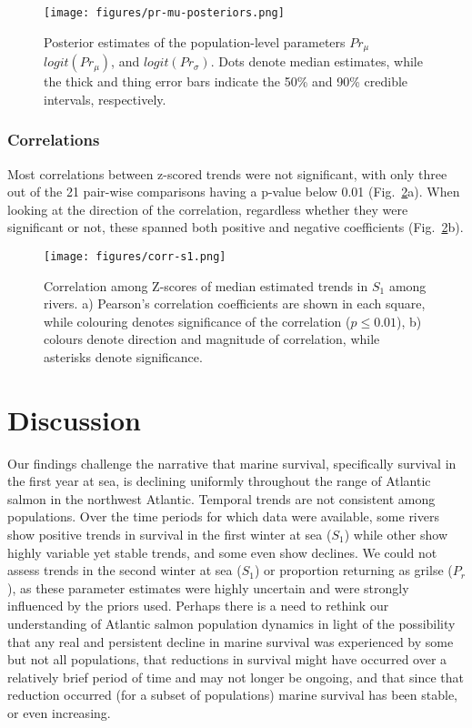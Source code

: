 \documentclass[12pt]{article}
\newcommand{\So}{$S_{1}$\xspace}
\newcommand{\Pg}{$P_r$\xspace}
\begin{document}
\begin{figure}[htbp] \centering
    \texttt{[image: figures/pr-mu-posteriors.png]}
    \caption{Posterior estimates of the population-level parameters $Pr_{\mu}$
       $logit(Pr_{\mu})$, and $logit(Pr_{\sigma})$. Dots denote median estimates, while the thick and thing error bars indicate
       the 50\% and 90\% credible intervals, respectively.} 
   \label{fig:prmu-post} 
\end{figure}

\subsubsection*{Correlations}

Most correlations between z-scored trends were not significant, with only 
three out of the 21 pair-wise comparisons having a p-value below 0.01 (Fig.~\ref{fig:s1-corr}a).
When looking at the direction of the correlation, regardless whether they were
significant or not, these spanned both positive and negative coefficients
(Fig.~\ref{fig:s1-corr}b).

\begin{figure}[htbp] \centering
    \texttt{[image: figures/corr-s1.png]} \caption{
        Correlation among Z-scores of median estimated trends in \So among
        rivers. a) Pearson's correlation coefficients are shown in each square,
        while colouring denotes significance of the correlation ($p \leq 0.01$), b)
        colours denote direction and magnitude of correlation, while asterisks denote significance.}
\label{fig:s1-corr} 
\end{figure}

\section*{Discussion} 


Our findings challenge the narrative that marine survival, specifically survival in the first year at sea, is declining
uniformly throughout the range of Atlantic salmon in the northwest Atlantic.
Temporal trends are not consistent among populations. 
Over the time periods for which data were available, some rivers show positive trends in survival in the
first winter at sea (\So) while other show highly variable yet stable trends, and some even show
declines. We could not assess trends in the second winter at sea (\So) or
proportion returning as grilse (\Pg), as these parameter estimates were highly
uncertain and were strongly influenced by the priors used.
Perhaps there is a need to rethink our understanding of Atlantic salmon
population dynamics in light of the possibility that any real and persistent decline in marine survival was
experienced by some but not all populations, that reductions in survival might
have occurred over a relatively brief period of time and may not longer be ongoing, and that since that
reduction occurred (for a subset of populations) marine survival has
been stable, or even increasing.
\end{document}
